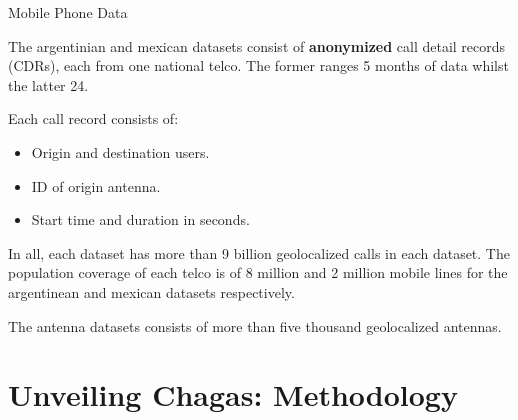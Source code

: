 \documentclass{beamer}
\begin{document}
%	

\begin{frame}{Mobile Phone Data}


The argentinian and mexican datasets consist of \textbf{anonymized} call detail records (CDRs), each from one national telco. The former ranges 5 months of data whilst the latter 24.


\medskip
Each call record consists of:
\begin{itemize}
	\item Origin and destination users. 
	\item ID of origin antenna.
	\item Start time and duration in seconds.
\end{itemize}

\medskip
In all, each dataset has more than 9 billion geolocalized calls in each dataset. The population coverage of each telco is of 8 million and 2 million mobile lines for the argentinean and mexican datasets respectively.

\medskip
The antenna datasets consists of more than five thousand geolocalized antennas.

\end{frame}

\section{Unveiling Chagas: Methodology}
	
\end{document}
